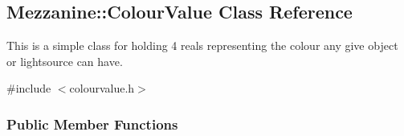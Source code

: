 \hypertarget{classMezzanine_1_1ColourValue}{
\subsection{Mezzanine::ColourValue Class Reference}
\label{classMezzanine_1_1ColourValue}
}


This is a simple class for holding 4 reals representing the colour any give object or lightsource can have.  




{\ttfamily \#include $<$colourvalue.h$>$}

\subsubsection*{Public Member Functions}

